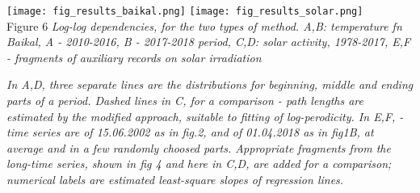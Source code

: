 \documentclass[a4paper]{article}
\begin{document}
\vskip 12pt
\texttt{[image: fig\_results\_baikal.png]}
\texttt{[image: fig\_results\_solar.png]}\\
Figure 6 \textit{Log-log dependencies, for the two types of method. A,B: temperature fn Baikal, A - 2010-2016, B - 2017-2018 period, C,D: solar activity, 1978-2017, E,F - fragments of auxiliary records on solar irradiation}

\textit{\small{In A,D, three separate lines are the distributions for beginning, middle and ending parts of a period. Dashed lines in C, for a comparison - path lengths are estimated by the modified approach,  suitable to fitting of log-perodicity. In E,F, - time series are of 15.06.2002 as in fig.2, and of 01.04.2018 as in fig1B, at average and in a few randomly choosed parts. Appropriate fragments from the long-time series, shown in fig 4 and here in C,D, are added for a comparison; numerical labels are estimated least-square slopes of regression lines.}}

\newpage
\end{document}

